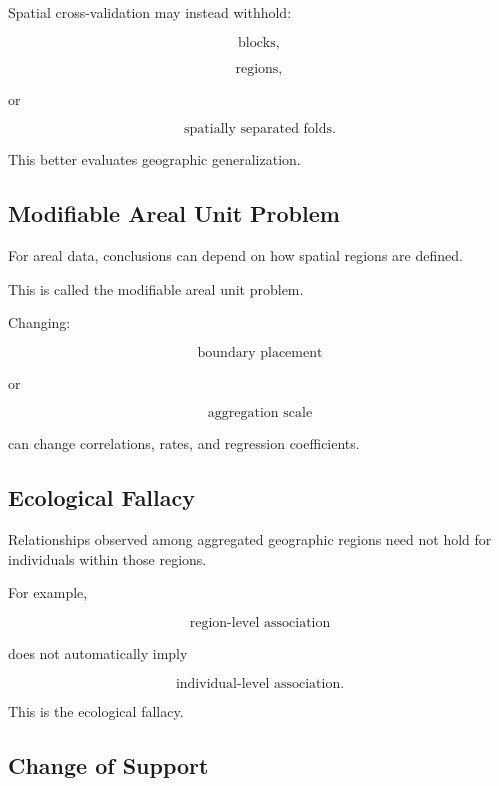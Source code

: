 Spatial cross-validation may instead withhold:

\[
\boxed{
\text{blocks},
}
\]

\[
\boxed{
\text{regions},
}
\]

or

\[
\boxed{
\text{spatially separated folds}.
}
\]

This better evaluates geographic generalization.

\subsection{Modifiable Areal Unit Problem}
\label{subsec:maup}

For areal data, conclusions can depend on how spatial regions are defined.

This is called the modifiable areal unit problem.

Changing:

\[
\boxed{
\text{boundary placement}
}
\]

or

\[
\boxed{
\text{aggregation scale}
}
\]

can change correlations, rates, and regression coefficients.

\subsection{Ecological Fallacy}
\label{subsec:ecological-fallacy-spatial}

Relationships observed among aggregated geographic regions need not hold
for individuals within those regions.

For example,

\[
\boxed{
\text{region-level association}
}
\]

does not automatically imply

\[
\boxed{
\text{individual-level association}.
}
\]

This is the ecological fallacy.

\subsection{Change of Support}
\label{subsec:change-of-support}

